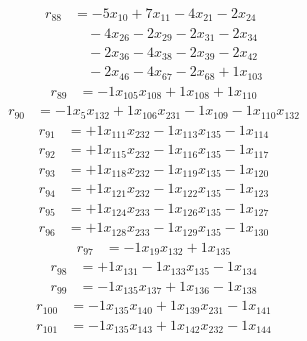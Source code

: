 \[\begin{aligned}
r_{88} &= - 5 x_{10} + 7 x_{11} - 4 x_{21} - 2 x_{24} \\
 &\quad - 4 x_{26} - 2 x_{29} - 2 x_{31} - 2 x_{34} \\
 &\quad - 2 x_{36} - 4 x_{38} - 2 x_{39} - 2 x_{42} \\
 &\quad - 2 x_{46} - 4 x_{67} - 2 x_{68} + 1 x_{103}
\end{aligned}\]
\[\begin{aligned}
r_{89} &= - 1 x_{105} x_{108} + 1 x_{108} + 1 x_{110}
\end{aligned}\]
\[\begin{aligned}
r_{90} &= - 1 x_{5} x_{132} + 1 x_{106} x_{231} - 1 x_{109} - 1 x_{110} x_{132}
\end{aligned}\]
\[\begin{aligned}
r_{91} &= + 1 x_{111} x_{232} - 1 x_{113} x_{135} - 1 x_{114}
\end{aligned}\]
\[\begin{aligned}
r_{92} &= + 1 x_{115} x_{232} - 1 x_{116} x_{135} - 1 x_{117}
\end{aligned}\]
\[\begin{aligned}
r_{93} &= + 1 x_{118} x_{232} - 1 x_{119} x_{135} - 1 x_{120}
\end{aligned}\]
\[\begin{aligned}
r_{94} &= + 1 x_{121} x_{232} - 1 x_{122} x_{135} - 1 x_{123}
\end{aligned}\]
\[\begin{aligned}
r_{95} &= + 1 x_{124} x_{233} - 1 x_{126} x_{135} - 1 x_{127}
\end{aligned}\]
\[\begin{aligned}
r_{96} &= + 1 x_{128} x_{233} - 1 x_{129} x_{135} - 1 x_{130}
\end{aligned}\]
\[\begin{aligned}
r_{97} &= - 1 x_{19} x_{132} + 1 x_{135}
\end{aligned}\]
\[\begin{aligned}
r_{98} &= + 1 x_{131} - 1 x_{133} x_{135} - 1 x_{134}
\end{aligned}\]
\[\begin{aligned}
r_{99} &= - 1 x_{135} x_{137} + 1 x_{136} - 1 x_{138}
\end{aligned}\]
\[\begin{aligned}
r_{100} &= - 1 x_{135} x_{140} + 1 x_{139} x_{231} - 1 x_{141}
\end{aligned}\]
\[\begin{aligned}
r_{101} &= - 1 x_{135} x_{143} + 1 x_{142} x_{232} - 1 x_{144}
\end{aligned}\]
